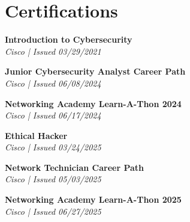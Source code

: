 \documentclass[letterpaper,11pt]{article}
\begin{document}
\section{Certifications}
  \begin{itemize}[leftmargin=0.15in, label={}]
    \small{
  \small{
    \item{
        \textbf{Introduction to Cybersecurity} \\
        \textit{Cisco | Issued 03/29/2021} \\
    }
    \item{
        \textbf{Junior Cybersecurity Analyst Career Path} \\
        \textit{Cisco | Issued 06/08/2024} \\
    }
    \item{
        \textbf{Networking Academy Learn-A-Thon 2024} \\
        \textit{Cisco | Issued 06/17/2024} \\
    }
    \item{
        \textbf{Ethical Hacker} \\
        \textit{Cisco | Issued 03/24/2025} \\
    }
    \item{
        \textbf{Network Technician Career Path} \\
        \textit{Cisco | Issued 05/03/2025} \\
    }
    \item{
        \textbf{Networking Academy Learn-A-Thon 2025} \\
        \textit{Cisco | Issued 06/27/2025} \\
    }

}}
\end{itemize}
\end{document}
